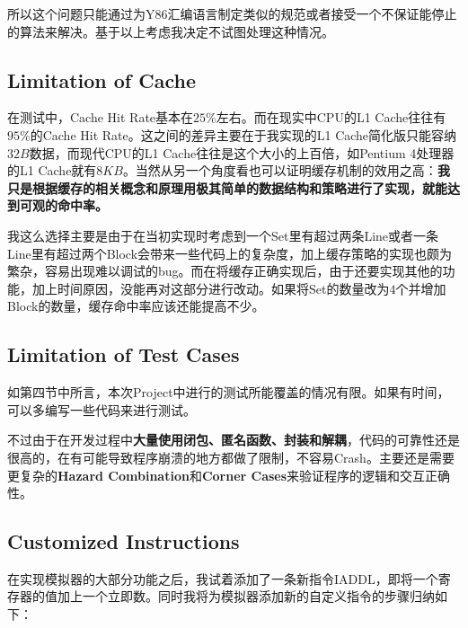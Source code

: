 所以这个问题只能通过为Y86汇编语言制定类似的规范或者接受一个不保证能停止的算法来解决。基于以上考虑我决定不试图处理这种情况。

\subsection{Limitation of Cache}

在测试中，Cache Hit Rate基本在$25\%$左右。而在现实中CPU的L1 Cache往往有$95\%$的Cache Hit Rate。这之间的差异主要在于我实现的L1 Cache简化版只能容纳$32B$数据，而现代CPU的L1 Cache往往是这个大小的上百倍，如Pentium 4处理器的L1 Cache就有$8KB$。当然从另一个角度看也可以证明缓存机制的效用之高：{\bf 我只是根据缓存的相关概念和原理用极其简单的数据结构和策略进行了实现，就能达到可观的命中率。}

我这么选择主要是由于在当初实现时考虑到一个Set里有超过两条Line或者一条Line里有超过两个Block会带来一些代码上的复杂度，加上缓存策略的实现也颇为繁杂，容易出现难以调试的bug。而在将缓存正确实现后，由于还要实现其他的功能，加上时间原因，没能再对这部分进行改动。如果将Set的数量改为$4$个并增加Block的数量，缓存命中率应该还能提高不少。

\subsection{Limitation of Test Cases}

如第四节中所言，本次Project中进行的测试所能覆盖的情况有限。如果有时间，可以多编写一些代码来进行测试。

不过由于在开发过程中{\bf 大量使用闭包、匿名函数、封装和解耦}，代码的可靠性还是很高的，在有可能导致程序崩溃的地方都做了限制，不容易Crash。主要还是需要更复杂的{\bf Hazard Combination}和{\bf Corner Cases}来验证程序的逻辑和交互正确性。

\subsection{Customized Instructions}

在实现模拟器的大部分功能之后，我试着添加了一条新指令IADDL，即将一个寄存器的值加上一个立即数。同时我将为模拟器添加新的自定义指令的步骤归纳如下：

